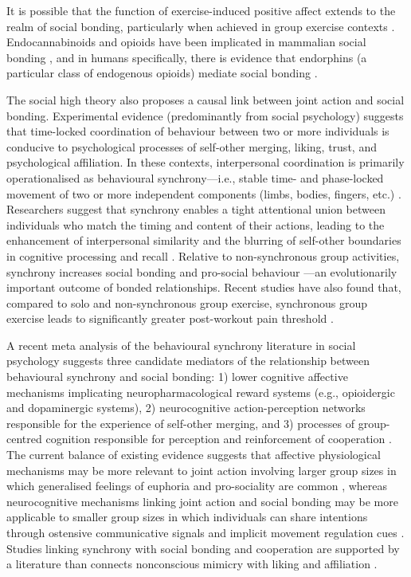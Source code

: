 \begin{CJK}{UTF8}{gbsn}
It is possible that the function of exercise-induced positive affect extends to the realm of social bonding, particularly when achieved in group exercise contexts \citep{Cohen2009,Machin2011}.  Endocannabinoids and opioids have been implicated in mammalian social bonding \citep{Fattore2010,Keverne1989}, and in humans specifically, there is evidence that endorphins (a particular class of endogenous opioids) mediate social bonding \citep{Dunbar2012,Shultz2010}.

The social high theory also proposes a causal link between joint action and social bonding.  Experimental evidence (predominantly from social psychology) suggests that time-locked coordination of behaviour between two or more individuals is conducive to psychological processes of self-other merging, liking, trust, and psychological affiliation.  In these contexts, interpersonal coordination is primarily operationalised as behavioural synchrony---i.e., stable time- and phase-locked movement of two or more independent components (limbs, bodies, fingers, etc.) \citep{Pikovsky2007}. Researchers suggest that synchrony enables a tight attentional union between individuals who match the timing and content of their actions, leading to the enhancement of interpersonal similarity and the blurring of self-other boundaries in cognitive processing and recall \citep{Cohen2017}.  Relative to non-synchronous group activities, synchrony increases social bonding and pro-social behaviour \citep{Reddish2013,Reddish2013a,Wiltermuth2009,Tarr2014}---an evolutionarily important outcome of bonded relationships.  Recent studies have also found that, compared to solo and non-synchronous group exercise, synchronous group exercise leads to significantly greater post-workout pain threshold \citep{Cohen2009,Sullivan2014,Sullivan2013a, Sullivan2013b}.

A recent meta analysis of the behavioural synchrony literature in social psychology suggests three candidate mediators of the relationship between behavioural synchrony and social bonding: 1) lower cognitive affective mechanisms implicating neuropharmacological reward systems (e.g., opioidergic and dopaminergic systems), 2) neurocognitive action-perception networks responsible for the experience of self-other merging, and 3) processes of group-centred cognition responsible for perception and reinforcement of cooperation \citep{Mogan2017}.  The current balance of existing evidence suggests that affective physiological mechanisms may be more relevant to joint action involving larger group sizes in which generalised feelings of euphoria and pro-sociality are common \citep[e.g., mass religious rituals or music festivals, see][]{Weinstein2016}, whereas neurocognitive mechanisms linking joint action and social bonding may be more applicable to smaller group sizes in which individuals can share intentions through ostensive communicative signals and implicit movement regulation cues \citep{Lang2017}.  Studies linking synchrony with social bonding and cooperation are supported by a literature than connects nonconscious mimicry with liking and affiliation \citep{VanBaaren2009}.


\end{CJK}

